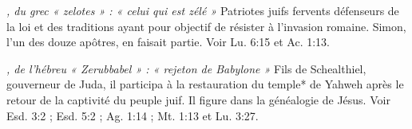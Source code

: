 \begin{multicols}{2}
{\textit{, du grec « zelotes » : « celui qui est zélé »}\newline
Patriotes juifs fervents défenseurs de la loi et des traditions ayant pour objectif de résister à l'invasion romaine. Simon, l'un des douze apôtres, en faisait partie. Voir Lu. 6:15 et Ac. 1:13.

\textit{, de l'hébreu « Zerubbabel » : « rejeton de Babylone »}\newline
Fils de Schealthiel, gouverneur de Juda, il participa à la restauration du temple* de Yahweh après le retour de la captivité du peuple juif. Il figure dans la généalogie de Jésus. Voir Esd. 3:2 ; Esd. 5:2 ; Ag. 1:14 ; Mt. 1:13 et Lu. 3:27.
}
\end{multicols}
